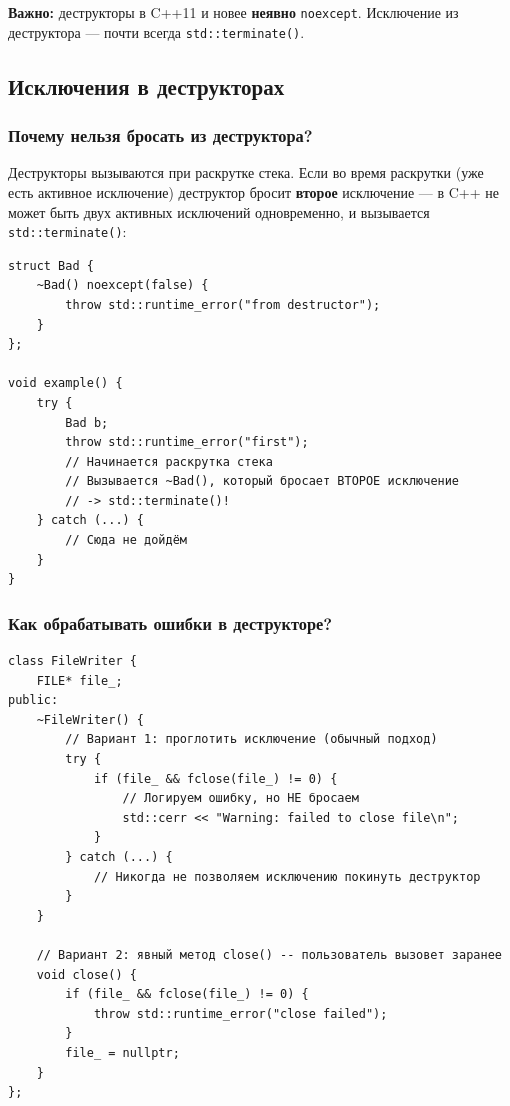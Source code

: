 \documentclass[a4paper,12pt]{article}
\begin{document}
\textbf{Важно:} деструкторы в C++11 и новее \textbf{неявно}
\texttt{noexcept}. Исключение из деструктора --- почти всегда
\texttt{std::terminate()}.

\subsection{Исключения в деструкторах}

\subsubsection{Почему нельзя бросать из деструктора?}

Деструкторы вызываются при раскрутке стека. Если во время раскрутки
(уже есть активное исключение) деструктор бросит \textbf{второе} исключение ---
в C++ не может быть двух активных исключений одновременно, и вызывается
\texttt{std::terminate()}:

\begin{lstlisting}
struct Bad {
    ~Bad() noexcept(false) {
        throw std::runtime_error("from destructor");
    }
};

void example() {
    try {
        Bad b;
        throw std::runtime_error("first");
        // Начинается раскрутка стека
        // Вызывается ~Bad(), который бросает ВТОРОЕ исключение
        // -> std::terminate()!
    } catch (...) {
        // Сюда не дойдём
    }
}
\end{lstlisting}

\subsubsection{Как обрабатывать ошибки в деструкторе?}

\begin{lstlisting}
class FileWriter {
    FILE* file_;
public:
    ~FileWriter() {
        // Вариант 1: проглотить исключение (обычный подход)
        try {
            if (file_ && fclose(file_) != 0) {
                // Логируем ошибку, но НЕ бросаем
                std::cerr << "Warning: failed to close file\n";
            }
        } catch (...) {
            // Никогда не позволяем исключению покинуть деструктор
        }
    }

    // Вариант 2: явный метод close() -- пользователь вызовет заранее
    void close() {
        if (file_ && fclose(file_) != 0) {
            throw std::runtime_error("close failed");
        }
        file_ = nullptr;
    }
};
\end{lstlisting}
\end{document}
